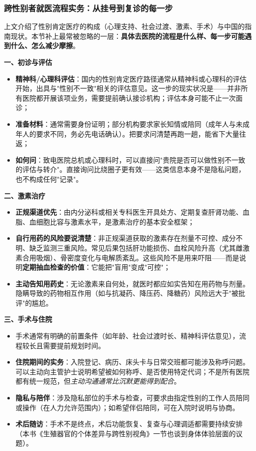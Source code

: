 \subsubsection{跨性别者就医流程实务：从挂号到复诊的每一步}

上文介绍了性别肯定医疗的构成（心理支持、社会过渡、激素、手术）与中国的指南现状。本节补上最常被忽略的一层：\textbf{具体去医院的流程是什么样、每一步可能遇到什么、怎么减少摩擦}。

\textbf{一、初诊与评估}
\begin{itemize}
\item \textbf{精神科/心理科评估}：国内的性别肯定医疗路径通常从精神科或心理科的评估开始，出具与"性别不一致"相关的评估意见。这一步的现实状况是——并非所有医院都开展该项业务，需要提前确认接诊机构；评估本身可能不止一次面诊；
\item \textbf{准备材料}：通常需要身份证明；部分机构要求家长知情或陪同（成年人与未成年人的要求不同，务必先电话确认）。把要求问清楚再跑一趟，能省下大量往返；
\item \textbf{如何问}：致电医院总机或心理科时，可以直接问"贵院是否可以做性别不一致的评估与转介"。直接询问比绕圈子更有效——这类信息本身不是隐私问题，也不构成任何"记录"。
\end{itemize}

\textbf{二、激素治疗}
\begin{itemize}
\item \textbf{正规渠道优先}：由内分泌科或相关专科医生开具处方、定期复查肝肾功能、血脂、血细胞比容与激素水平，是激素治疗的基本安全框架；
\item \textbf{自行用药的风险要说清楚}：非正规渠道获取的激素存在剂量不可控、成分不明、缺乏监测三重风险。常见后果包括肝功能损伤、血栓风险升高（尤其雌激素合用吸烟）、骨密度变化与电解质紊乱。这些风险不是用来吓阻——而是说明\textbf{定期抽血检查的价值}：它能把"盲用"变成"可控"；
\item \textbf{主动告知用药史}：无论激素来自何处，就医时都应如实告知在用药物与剂量。隐瞒导致的药物相互作用（如与抗凝药、降压药、降糖药）风险远大于"被批评"的尴尬。
\end{itemize}

\textbf{三、手术与住院}
\begin{itemize}
\item 手术通常有明确的前置条件（如年龄、社会过渡时长、精神科评估意见），流程较长且需要提前规划时间。
\item \textbf{住院期间的实务}：入院登记、病历、床头卡与日常交班都可能涉及称呼问题。可以主动向主管护士说明希望被如何称呼、是否使用特定代词；不是所有医院都有统一规范，但\emph{主动沟通通常比沉默更能得到配合}。
\item \textbf{隐私与陪伴}：涉及隐私部位的手术与检查，可要求由指定性别的工作人员陪同或操作（在人力允许范围内）；如希望伴侣陪同，可在入院时说明与协商。
\item \textbf{术后随访}：手术不是终点，术后功能恢复、复查与心理调适都需要持续安排（本书《生殖器官的个体差异与跨性别视角》一节也谈到身体体验层面的议题）。
\end{itemize}

